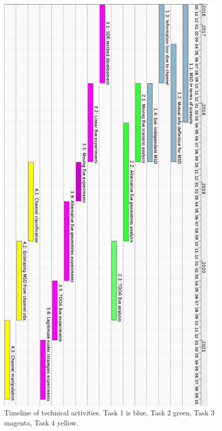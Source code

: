 \documentclass[12pt, titlepage]{article}
\begin{document}
\begin{figure}
\begin{center}
\includegraphics[height=0.95\textheight]{NSF_proj_gantt.jpg}
\caption{Timeline of technical activities.  Task 1 is blue, Task 2 green, Task 3 magenta, Task 4 yellow.}\label{timeline}
\end{center}
\end{figure}
\clearpage
\end{document}
